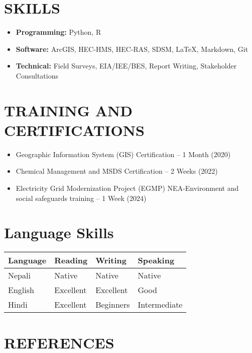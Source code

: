 \documentclass[a4paper, 09pt]{extarticle}
\begin{document}
\vspace{5pt}



\section*{SKILLS}
\begin{itemize}
    \item \textbf{Programming:} Python, R
    \item \textbf{Software:} ArcGIS, HEC-HMS, HEC-RAS, SDSM, LaTeX, Markdown, Git
    \item \textbf{Technical:} Field Surveys, EIA/IEE/BES, Report Writing, Stakeholder Consultations
\end{itemize}

\section*{TRAINING AND CERTIFICATIONS}
\begin{itemize}
    \item Geographic Information System (GIS) Certification – 1 Month (2020)
    \item Chemical Management and MSDS Certification – 2 Weeks (2022)
    \item Electricity Grid Modernization Project (EGMP) NEA-Environment and social safeguards training – 1 Week (2024)
    
\end{itemize}

\section*{Language Skills}

\noindent
\begin{tabularx}{\textwidth}{|l|X|X|X|}
\hline
\textbf{Language} & \textbf{Reading} & \textbf{Writing} & \textbf{Speaking} \\ \hline
Nepali & Native & Native & Native \\ \hline
English & Excellent & Excellent & Good \\ \hline
Hindi & Excellent & Beginners & Intermediate \\ \hline
\end{tabularx}

\section*{REFERENCES}
\end{document}
